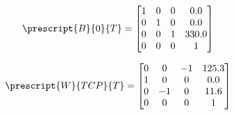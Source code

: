 \noindent\begin{minipage}{0.48\textwidth}
\begin{equation}
\prescript{B}{0}{T} =
    \begin{bmatrix}
  1    &   0    &   0   &  0.0\\
  0    &   1    &   0   &  0.0\\
  0    &   0    &   1   &  330.0\\
  0    &   0    &   0   &  1
    \end{bmatrix} \label{eqab}
\end{equation}
\end{minipage}%
\hfill
\begin{minipage}{0.48\textwidth}
\begin{equation}
\prescript{W}{TCP}{T} =
\begin{bmatrix}
  0  &   0  &  -1  &  125.3\\
  1  &   0  &   0  &    0.0\\
  0  &  -1  &   0  &   11.6\\
  0  &   0  &   0  &    1
\end{bmatrix} \label{eqcd}
\end{equation}
\end{minipage}
